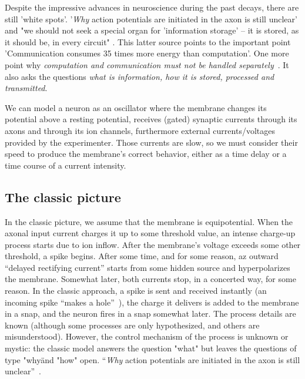 Despite the impressive advances in neuroscience during the past decays,
there are still 'white spots'. '\textit{Why} action potentials are initiated in the axon is still
unclear' \cite{ActionPotentialGenerationNatrium:2008} and
"we should not seek a special organ for 'information storage' -- it is stored,
as it should be, in every circuit" \cite{SterlingPrinciples:2017}.
This latter source points to the important point
'Communication consumes 35 times more energy than computation'. \cite{EnergyNeuralCommunication:2021}
One more point why \textit{computation and communication must not be handled separately}~\cite{EDVACreport1945}.
It also asks the questions \textit{what is information, how it is stored, processed and transmitted}.




We can model a neuron as an oscillator where the membrane changes its potential above a resting potential, receives
(gated) synaptic currents through its axons and through its ion channels, furthermore
external currents/voltages provided by the experimenter.
Those currents are slow, so we must consider their speed
to produce the membrane's correct behavior, either as a time delay
or a time course of a current intensity.



\subsection{The classic picture\label{sec:Physiology-APClassic}}

In the classic picture, we assume that the membrane is equipotential.
When the axonal input current charges it up to some threshold value,
an intense charge-up process starts due to ion inflow. After the
membrane's voltage exceeds some other threshold, a spike begins. After
some time, and for some reason, az outward ``delayed rectifying current''
starts from some hidden source and hyperpolarizes the membrane. Somewhat
later, both currents stop, in a concerted way, for some reason. In
the classic approach, a spike is sent and received instantly (an incoming
spike ``makes a hole''~\cite{KochElectricalPropertiesSpike:1983}),
the charge it delivers is added to the membrane in a snap, and
the neuron fires in a snap somewhat later. The process details are
known (although some processes are only hypothesized, and others are
misunderstood). However, the control mechanism of the process
is unknown or mystic: the classic model answers the question "what"
but leaves the questions of type "why\"
and "how" open. ``\emph{Why}
action potentials are initiated in the axon is still unclear''~\cite{ActionPotentialGenerationNatrium:2008}. 




